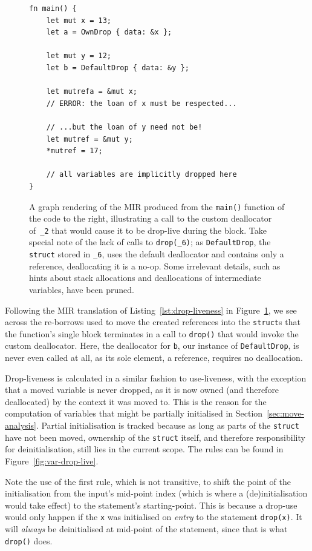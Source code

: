 \documentclass[11pt,a4paper,twoside,openany]{report}
\newenvironment{sourcecode}{\captionsetup{type=listing}}{}
\newcommand{\InRust}[1]{\texttt{#1}}
\begin{document}
\begin{figure}
\begin{minipage}{.5\textwidth}
\begin{sourcecode}
\begin{verbatim}
fn main() {
    let mut x = 13;
    let a = OwnDrop { data: &x };

    let mut y = 12;
    let b = DefaultDrop { data: &y };
    
    let mutrefa = &mut x;
    // ERROR: the loan of x must be respected...
    
    // ...but the loan of y need not be!
    let mutref = &mut y;
    *mutref = 17;
    
    // all variables are implicitly dropped here
}
\end{verbatim}
\end{sourcecode}
\end{minipage}
\caption[MIR of a Program Utilising a Custom Deallocator]{A graph rendering of
  the MIR produced from the \InRust{main()} function of the code to the right,
  illustrating a call to the custom deallocator of~\InRust{_2} that would cause
  it to be drop-live during the block. Take special note of the lack of calls to
  \InRust{drop(_6)}; as \InRust{DefaultDrop}, the \InRust{struct} stored in
  \InRust{_6}, uses the default deallocator and contains only a reference,
  deallocating it is a no-op. Some irrelevant details, such as hints about stack
  allocations and deallocations of intermediate variables, have been pruned.}\label{fig:drop-liveness}
\end{figure}

Following the MIR translation of Listing~\ref{lst:drop-liveness} in
Figure~\ref{fig:drop-liveness}, we see across the re-borrows used to move the
created references into the \InRust{struct}s that the function's single block
terminates in a call to \InRust{drop()} that would invoke the custom
deallocator. Here, the deallocator for \InRust{b}, our instance of
\InRust{DefaultDrop}, is never even called at all, as its sole element, a
reference, requires no deallocation.

Drop-liveness is calculated in a similar fashion to use-liveness, with the
exception that a moved variable is never dropped, as it is now owned (and
therefore deallocated) by the context it was moved to. This is the reason for
the computation of variables that might be partially initialised in
Section~\ref{sec:move-analysis}. Partial initialisation is tracked because as
long as parts of the \InRust{struct} have not been moved, ownership of the
\InRust{struct} itself, and therefore responsibility for deinitialisation, still
lies in the current scope. The rules can be found in
Figure~\ref{fig:var-drop-live}.

Note the use of the first rule, which is not transitive, to shift the point of
the initialisation from the input's mid-point index (which is where a
(de)initialisation would take effect) to the statement's starting-point. This is
because a drop-use would only happen if the \InRust{x} was initialised on
\textit{entry} to the statement \InRust{drop(x)}. It will \emph{always} be
deinitialised at mid-point of the statement, since that is what \InRust{drop()}
does.
\end{document}
